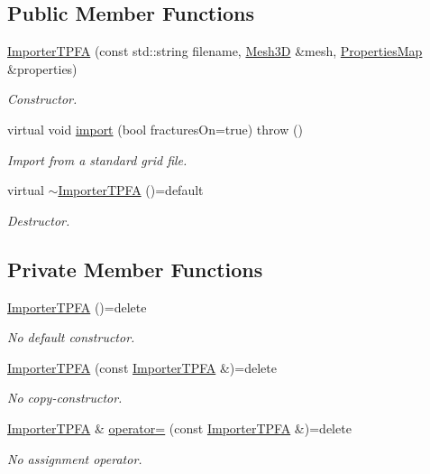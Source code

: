 \subsection*{Public Member Functions}
\begin{DoxyCompactItemize}
\item 
\hyperlink{classFVCode3D_1_1ImporterTPFA_a7823b5af6a6a691ad0fb17dde3b1fe8d}{Importer\+T\+P\+FA} (const std\+::string filename, \hyperlink{classFVCode3D_1_1Mesh3D}{Mesh3D} \&mesh, \hyperlink{classFVCode3D_1_1PropertiesMap}{Properties\+Map} \&properties)
\begin{DoxyCompactList}\small\item\em Constructor. \end{DoxyCompactList}\item 
virtual void \hyperlink{classFVCode3D_1_1ImporterTPFA_adafe208596baeaca51051ea9692fa757}{import} (bool fractures\+On=true)  throw ()
\begin{DoxyCompactList}\small\item\em Import from a standard grid file. \end{DoxyCompactList}\item 
virtual \hyperlink{classFVCode3D_1_1ImporterTPFA_a1518a9bcc361f8e1b79d529242db7e95}{$\sim$\+Importer\+T\+P\+FA} ()=default
\begin{DoxyCompactList}\small\item\em Destructor. \end{DoxyCompactList}\end{DoxyCompactItemize}
\subsection*{Private Member Functions}
\begin{DoxyCompactItemize}
\item 
\hyperlink{classFVCode3D_1_1ImporterTPFA_ab1a2cd70e6cadff7588f01ff7743bda3}{Importer\+T\+P\+FA} ()=delete
\begin{DoxyCompactList}\small\item\em No default constructor. \end{DoxyCompactList}\item 
\hyperlink{classFVCode3D_1_1ImporterTPFA_a36ba9db3fe2d042a32c1540eb31643dd}{Importer\+T\+P\+FA} (const \hyperlink{classFVCode3D_1_1ImporterTPFA}{Importer\+T\+P\+FA} \&)=delete
\begin{DoxyCompactList}\small\item\em No copy-\/constructor. \end{DoxyCompactList}\item 
\hyperlink{classFVCode3D_1_1ImporterTPFA}{Importer\+T\+P\+FA} \& \hyperlink{classFVCode3D_1_1ImporterTPFA_a180b3a7ae97a32e34ad7b338bc08e235}{operator=} (const \hyperlink{classFVCode3D_1_1ImporterTPFA}{Importer\+T\+P\+FA} \&)=delete
\begin{DoxyCompactList}\small\item\em No assignment operator. \end{DoxyCompactList}\end{DoxyCompactItemize}
